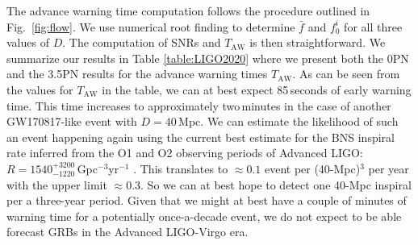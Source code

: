 \documentclass[prd,amsmath,amssymb,aps,floats,amsfonts,notitlepage,superscriptaddress,eqsecnum,nofootinbib,10pt]{revtex4-1}
\begin{document}
The advance warning time computation follows the procedure outlined in Fig.~\ref{fig:flow}. We use numerical root finding to determine $\bar{f}$ and $f_0^i$ for all three values of $D$. 
The computation of SNRs and $T_\text{AW}$ is then straightforward. 
We summarize our results in Table \ref{table:LIGO2020} where we present both the 0PN and the 3.5PN results for the advance warning times
$T_\text{AW}$. As can be seen from the values for $T_\text{AW}$ in the table, we can at best expect 85\,seconds of early warning time.
This time increases to approximately two\,minutes in the case of another GW170817-like event with $D=40\,$Mpc.
We can estimate the likelihood of such an event happening again
using the current best estimate for the BNS inspiral rate 
inferred from the O1 and O2 observing periods of Advanced LIGO: $ R=1540^{+3200}_{-1220}\,$Gpc$^{-3}$yr$^{-1}$ \cite{GW170817}.
This translates to $\approx 0.1$ event per (40-Mpc)$^3$ per year with the upper limit $\approx 0.3$. So we can at best hope to detect
one 40-Mpc inspiral per a three-year period.
Given that we might at best have a couple of minutes of warning time for a potentially once-a-decade event, we do not expect to be able forecast GRBs in the Advanced LIGO-Virgo era. 
%
%
\end{document}
